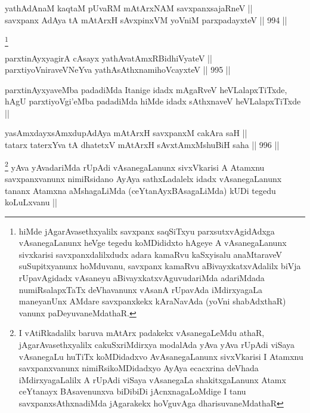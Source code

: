 
\begin{shl}
yathA\s \s dAnaM kaqtaM pUvaRM mAtArxNAM savxpanxsajaRneV ||  \\
savxpanx AdAya tA mAtArxH sAvxpinxVM yoVniM parxpadayxteV ||  994 ||  
\end{shl}

\begin{artha}
\footnote{hiMde jAgarAvasethxyalilx savxpanx saqSiTxyu parxsutxvAgidAdxga vAsanegaLanunx heVge tegedu koMDididxto hAgeye A vAsanegaLanunx sivxkarisi savxpanxdalilxdudx adara kamaRvu kaSxyisalu anaMtaraveV suSupitxyanunx hoMduvanu, savxpanx kamaRvu aBivayxkatxvAdalilx biVja rUpavAgidadx vAsaneyu aBivayxkatxvAguvudariMda adariMdada numiRsalapxTaTx deVhavanunx vAsanA rUpavAda iMdirxyagaLa maneyanUnx AMdare savxpanxkekx kAraNavAda (yoVni shabAdxthaR) vanunx paDeyuvaneMdathaR.}
\end{artha}


\begin{shl}
parxtinAyxyagirA cAsayx yathAvatAmxRBidhiVyateV || \\
parxtiyoVniraveVNeYva yathAsAthxnamihoVcayxteV ||  995 ||  
\end{shl}

\begin{artha}
parxtinAyxyaveMba padadiMda Itanige \footnotemark idadx mAgaRveV heVLalapxTiTxde, hAgU parxtiyoVgi'eMba padadiMda \footnotemark hiMde idadx sAthxnaveV heVLalapxTiTxde ||
\end{artha}


\begin{shl}
yasAmxdayxsAmxdupAdAya mAtArxH savxpanxM cakAra saH || \\
tatarx taterxYva tA dhatetxV mAtArxH sAvxtAmxMshuBiH saha ||  996 ||  
\end{shl}

\begin{artha}
\footnote{I vAtiRkadalilx baruva mAtArx padakekx vAsanegaLeMdu athaR, jAgarAvasethxyalilx cakuSxriMdirxya modalAda yAva yAva rUpAdi viSaya vAsanegaLu huTiTx koMDidadxvo AvAsanegaLanunx sivxVkarisi I Atamxnu savxpanxvanunx nimiRsikoMDidadxyo AyAya ecacxrina deVhada iMdirxyagaLalilx A rUpAdi viSaya vAsanegaLa shakitxgaLanunx Atamx ceYtanayx BAsavenunxva biDibiDi jAcnxnagaLoMdige I tanu savxpanxsAthxnadiMda jAgarakekx hoVguvAga dharisuvaneMdathaR}
yAva yAvadariMda rUpAdi vAsanegaLanunx sivxVkarisi A Atamxnu savxpanxvanunx nimiRsidano AyAya sathxLadalelx idadx vAsanegaLanunx tananx Atamxna aMshagaLiMda (ceYtanAyxBAsagaLiMda) kUDi tegedu koLuLxvanu ||
\end{artha}

